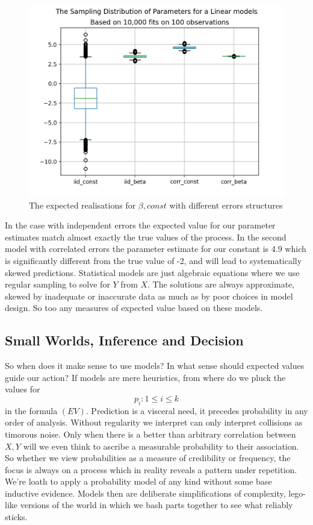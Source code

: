 \documentclass[10pt,a4paper,notitlepage, twocolumn]{article}
\begin{document}
\raggedbottom 

\begin{figure}[H]
  \includegraphics[width=\linewidth]{./Plots/distribution_of_beta1.png}
  \caption{The expected realisations for $\beta, const$ with different errors structures}
\end{figure}

In the case with independent errors the expected value for our parameter estimates match almost exactly the true values of the process. In the second model with correlated errors the parameter estimate for our constant is 4.9 which is significantly different from the true value of -2, and will lead to systematically skewed predictions. Statistical models are just algebraic equations where we use regular sampling to solve for $Y$ from $X$. The solutions are always approximate, skewed by inadequate or inaccurate data as much as by poor choices in model design. So too any measures of expected value based on these models.

\subsection*{Small Worlds, Inference and Decision}
So when does it make sense to use models? In what sense should expected values guide our action? If models are mere heuristics, from where do we pluck the values for $$p_{i} : 1 \leq i \leq k$$ in the formula $(EV)$. Prediction is a visceral need, it precedes probability in any order of analysis. Without regularity we interpret can only interpret collisions as timorous noise. Only when there is a better than arbitrary correlation between $X, Y$ will we even think to ascribe a measurable probability to their association. So whether we view probabilities as a measure of credibility or frequency, the focus is always on a process which in reality reveals a pattern under repetition. We're loath to apply a probability model of any kind without some base inductive evidence.
Models then are deliberate simplifications of complexity, lego-like versions of the world in which we bash parts together to see what reliably sticks. 
\end{document}
